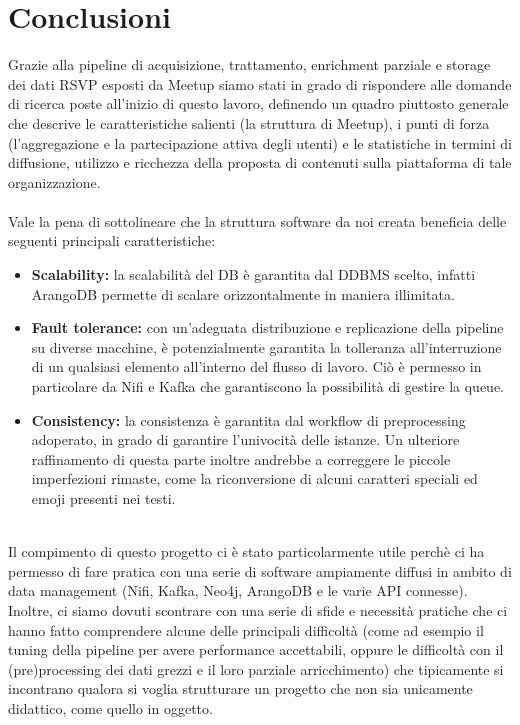\documentclass[fleqn,10pt]{SelfArx} %
\begin{document}
{\section{Conclusioni}
Grazie alla pipeline di acquisizione, trattamento, enrichment parziale e storage dei dati RSVP esposti da Meetup siamo stati in grado di rispondere alle domande di ricerca poste all'inizio di questo lavoro, definendo un quadro piuttosto generale che descrive le caratteristiche salienti (la struttura di Meetup), i punti di forza (l'aggregazione e la partecipazione attiva degli utenti) e le statistiche in termini di diffusione, utilizzo e ricchezza della proposta di contenuti sulla piattaforma di tale organizzazione. \\
\\
Vale la pena di sottolineare che la struttura software da noi creata beneficia delle seguenti principali caratteristiche:
\begin{itemize}
\item \textbf{Scalability:} la scalabilità del DB è garantita dal DDBMS scelto, infatti ArangoDB permette di scalare orizzontalmente in maniera illimitata.
\item \textbf{Fault tolerance:} con un'adeguata distribuzione e replicazione della pipeline su diverse macchine, è potenzialmente garantita la tolleranza all'interruzione di un qualsiasi elemento all'interno del flusso di lavoro. Ciò è permesso in particolare da Nifi e Kafka che garantiscono la possibilità di gestire la queue.
\item \textbf{Consistency:} la consistenza è garantita dal workflow di preprocessing adoperato, in grado di garantire l'univocità delle istanze. Un ulteriore raffinamento di questa parte inoltre andrebbe a correggere le piccole imperfezioni rimaste, come la riconversione di alcuni caratteri speciali ed emoji presenti nei testi.
\end{itemize}
$~$\\
Il compimento di questo progetto ci è stato particolarmente utile perchè ci ha permesso di fare pratica con una serie di software ampiamente diffusi in ambito di data management (Nifi, Kafka, Neo4j, ArangoDB e le varie API connesse). 
\\
Inoltre, ci siamo dovuti scontrare con una serie di sfide e necessità pratiche che ci hanno fatto comprendere alcune delle principali difficoltà (come ad esempio il tuning della pipeline per avere performance accettabili, oppure le difficoltà con il (pre)processing dei dati grezzi e il loro parziale arricchimento) che tipicamente si incontrano qualora si voglia strutturare un progetto che non sia unicamente didattico, come quello in oggetto.
}
\end{document}
